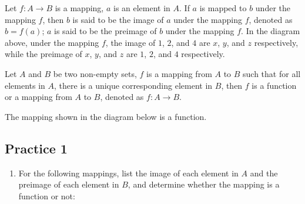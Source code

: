 \documentclass[12pt]{report}
\begin{document}
Let $f:A \to B$ is a mapping, $a$ is an element in $A$. If $a$ is mapped to $b$
under the mapping $f$, then $b$ is said to be the image of $a$ under the
mapping $f$, denoted as $b = f(a)$; $a$ is said to be the preimage of $b$ under
the mapping $f$. In the diagram above, under the mapping $f$, the image of $1$,
$2$, and $4$ are $x$, $y$, and $z$ respectively, while the preimage of $x$,
$y$, and $z$ are $1$, $2$, and $4$ respectively.

\begin{mdframed}[style=MyFrame]
  Let $A$ and $B$ be two non-empty sets, $f$ is a mapping from $A$ to $B$ such that for all elements in $A$, there is a unique corresponding element in $B$, then $f$ is a function or a mapping from $A$ to $B$, denoted as $f:A \to B$.
\end{mdframed}

\newpage

The mapping shown in the diagram below is a function.
\begin{center}
\end{center}

\subsection*{Practice 1}

\begin{enumerate}[leftmargin=15pt]
  \item For the following mappings, list the image of each element in $A$ and the
        preimage of each element in $B$, and determine whether the mapping is a
        function or not:
\end{enumerate}
\end{document}
